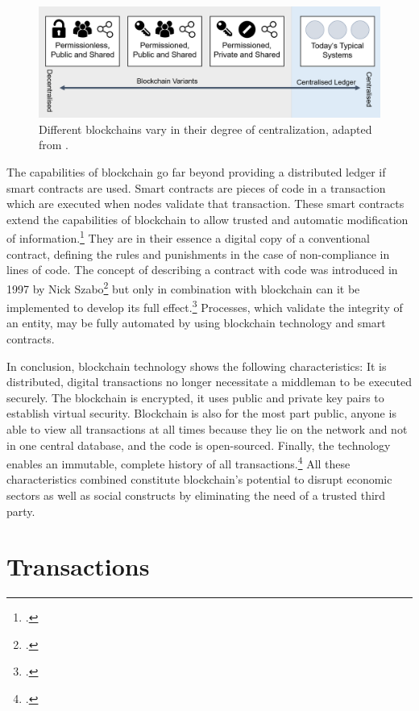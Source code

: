 \begin{figure}[h!]
 \centering
 \includegraphics[width = \textwidth]{graphics/Picture1.png}
 \caption{Different blockchains vary in their degree of centralization, adapted from \cite{GOV.2016}.}
 \label{fig:DLTs}
\end{figure}

The capabilities of blockchain go far beyond providing a distributed ledger if smart contracts are used. Smart contracts are pieces of code in a transaction which are executed when nodes validate that transaction. These smart contracts extend the capabilities of blockchain to allow trusted and automatic modification of information.\footcite[Cf.][p.14]{Schutte.2017} They are in their essence a digital copy of a conventional contract, defining the rules and punishments in the case of non-compliance in lines of code. The concept of describing a contract with code was introduced in 1997 by Nick Szabo\footcite[][]{Szabo.1997} but only in combination with blockchain can it be implemented to develop its full effect.\footcites[Cf.][p.23]{Schlatt.2016}[cf.][p.22-24]{GOV.2016} Processes, which validate the integrity of an entity, may be fully automated by using blockchain technology and smart contracts.

In conclusion, blockchain technology shows the following characteristics: It is distributed, digital transactions no longer necessitate a middleman to be executed securely. The blockchain is encrypted, it uses public and private key pairs to establish virtual security. Blockchain is also for the most part public, anyone is able to view all transactions at all times because they lie on the network and not in one central database, and the code is open-sourced. Finally, the technology enables an immutable, complete history of all transactions.\footcite[Cf.][p.5]{Tapscott.2017} All these characteristics combined constitute blockchain's potential to disrupt economic sectors as well as social constructs by eliminating the need of a trusted third party. 

\section{Transactions} \label{sec:TX}

